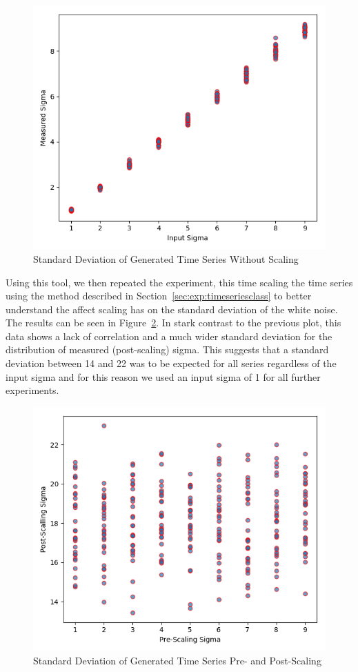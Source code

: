 \documentclass[oneside,12pt,openany]{book}
\begin{document}
    \begin{figure}[hbt!]
        \centering
        \includegraphics[width=.8\linewidth]{images/SigmaOfSeries-PreScaling.png}
        \caption{Standard Deviation of Generated Time Series Without Scaling}
        \label{fig:sigmaofseries-pre}
    \end{figure}
    
    Using this tool, we then repeated the experiment, this time scaling the time series using the method described in Section~\ref{sec:exp:timeseriesclass} to better understand the affect scaling has on the standard deviation of the white noise. The results can be seen in Figure~\ref{fig:sigmaofseries-post}. In stark contrast to the previous plot, this data shows a lack of correlation and a much wider standard deviation for the distribution of measured (post-scaling) sigma. This suggests that a standard deviation between 14 and 22 was to be expected for all series regardless of the input sigma and for this reason we used an input sigma of 1 for all further experiments.
    
    \begin{figure}[hbt!]
        \centering
        \includegraphics[width=.8\linewidth]{images/SigmaOfSeries-PostScaling.png}
        \caption{Standard Deviation of Generated Time Series Pre- and Post-Scaling}
        \label{fig:sigmaofseries-post}
    \end{figure}
\end{document}
